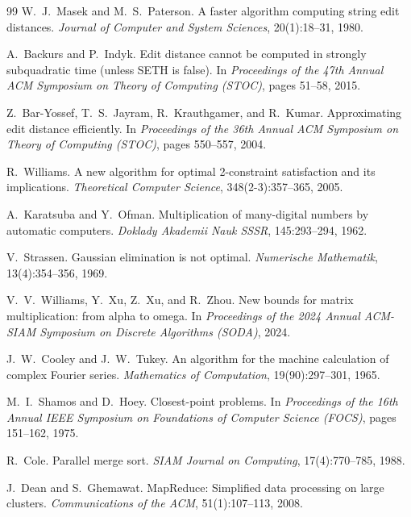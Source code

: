 ﻿\documentclass[a4paper,12pt]{article}
\theoremstyle{definition}
\begin{document}
\begin{thebibliography}{99}
W.\ J.\ Masek and M.\ S.\ Paterson.
\newblock A faster algorithm computing string edit distances.
\newblock \textit{Journal of Computer and System Sciences}, 20(1):18--31, 1980.

A.\ Backurs and P.\ Indyk.
\newblock Edit distance cannot be computed in strongly subquadratic time (unless SETH is false).
\newblock In \textit{Proceedings of the 47th Annual ACM Symposium on Theory of
         Computing (STOC)}, pages 51--58, 2015.

Z.\ Bar-Yossef, T.\ S.\ Jayram, R.\ Krauthgamer, and R.\ Kumar.
\newblock Approximating edit distance efficiently.
\newblock In \textit{Proceedings of the 36th Annual ACM Symposium on Theory of
         Computing (STOC)}, pages 550--557, 2004.

R.\ Williams.
\newblock A new algorithm for optimal 2-constraint satisfaction and its implications.
\newblock \textit{Theoretical Computer Science}, 348(2-3):357--365, 2005.

A.\ Karatsuba and Y.\ Ofman.
\newblock Multiplication of many-digital numbers by automatic computers.
\newblock \textit{Doklady Akademii Nauk SSSR}, 145:293--294, 1962.

V.\ Strassen.
\newblock Gaussian elimination is not optimal.
\newblock \textit{Numerische Mathematik}, 13(4):354--356, 1969.

V.\ V.\ Williams, Y.\ Xu, Z.\ Xu, and R.\ Zhou.
\newblock New bounds for matrix multiplication: from alpha to omega.
\newblock In \textit{Proceedings of the 2024 Annual ACM-SIAM Symposium on
         Discrete Algorithms (SODA)}, 2024.

J.\ W.\ Cooley and J.\ W.\ Tukey.
\newblock An algorithm for the machine calculation of complex Fourier series.
\newblock \textit{Mathematics of Computation}, 19(90):297--301, 1965.

M.\ I.\ Shamos and D.\ Hoey.
\newblock Closest-point problems.
\newblock In \textit{Proceedings of the 16th Annual IEEE Symposium on Foundations
         of Computer Science (FOCS)}, pages 151--162, 1975.

R.\ Cole.
\newblock Parallel merge sort.
\newblock \textit{SIAM Journal on Computing}, 17(4):770--785, 1988.

J.\ Dean and S.\ Ghemawat.
\newblock MapReduce: Simplified data processing on large clusters.
\newblock \textit{Communications of the ACM}, 51(1):107--113, 2008.


\end{thebibliography}
\end{document}

